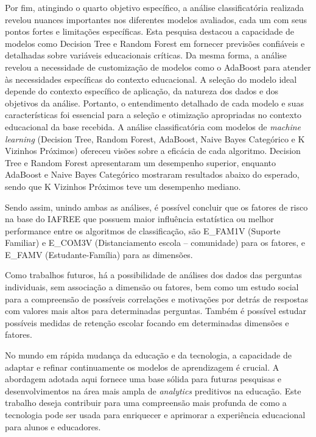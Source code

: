 Por fim, atingindo o quarto objetivo específico, a análise classificatória realizada revelou nuances importantes nos diferentes modelos avaliados, cada um com seus pontos fortes e limitações específicas. Esta pesquisa destacou a capacidade de modelos como Decision Tree e Random Forest em fornecer previsões confiáveis e detalhadas sobre variáveis educacionais críticas. Da mesma forma, a análise revelou a necessidade de customização de modelos como o AdaBoost para atender às necessidades específicas do contexto educacional. A seleção do modelo ideal depende do contexto específico de aplicação, da natureza dos dados e dos objetivos da análise. Portanto, o entendimento detalhado de cada modelo e suas características foi essencial para a seleção e otimização apropriadas no contexto educacional da base recebida. A análise classificatória com modelos de \textit{machine learning} (Decision Tree, Random Forest, AdaBoost, Naive Bayes Categórico e K Vizinhos Próximos) ofereceu visões sobre a eficácia de cada algoritmo. Decision Tree e Random Forest apresentaram um desempenho superior, enquanto AdaBoost e Naive Bayes Categórico mostraram resultados abaixo do esperado, sendo que K Vizinhos Próximos teve um desempenho mediano.

Sendo assim, unindo ambas as análises, é possível concluir que os fatores de risco na base do IAFREE que possuem maior influência estatística ou melhor performance entre os algoritmos de classificação, são E\_FAM1V (Suporte Familiar) e E\_COM3V (Distanciamento escola – comunidade) para os fatores, e E\_FAMV (Estudante-Família) para as dimensões.

Como trabalhos futuros, há a possibilidade de análises dos dados das perguntas individuais, sem associação a dimensão ou fatores, bem como um estudo social para a compreensão de possíveis correlações e motivações por detrás de respostas com valores mais altos para determinadas perguntas. Também é possível estudar possíveis medidas de retenção escolar focando em determinadas dimensões e fatores.

No mundo em rápida mudança da educação e da tecnologia, a capacidade de adaptar e refinar continuamente os modelos de aprendizagem é crucial. A abordagem adotada aqui fornece uma base sólida para futuras pesquisas e desenvolvimentos na área mais ampla de \textit{analytics} preditivos na educação. Este trabalho deseja contribuir para uma compreensão mais profunda de como a tecnologia pode ser usada para enriquecer e aprimorar a experiência educacional para alunos e educadores.



